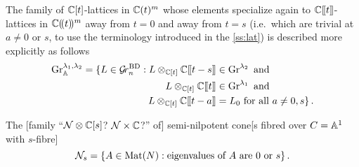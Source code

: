 \documentclass{article}
\begin{document}
The family  of $\CC[t]$-lattices in $\CC(t)^m$ whose elements specialize again to $\CC\xt$-lattices in $\CC\xT^m$ away from $t = 0$ and away from $t = s$ (i.e.\ which are trivial at $a \ne 0$ or $s$, to use the terminology introduced in the \cref{ss:lat}) is described more explicitly as follows
\begin{equation}
    \label{eq:defGrBDlambda}
    \begin{split}
        \Gr_{\AA}^{\lambda_1,\lambda_2} = 
        \{L \in\Grbd : 
        L \otimes_{\CC[t]} \CC\xt[t-s] 
        &\in \Gr^{\lambda_2} \text{ and } \\
        L\otimes_{\CC[t]} \CC\xt &\in \Gr^{\lambda_1} \text{ and } \\ 
        L \otimes_{\CC[t]} \CC\xt[t-a] &= L_0 \text{ for all $ a \ne 0, s$} \}\,.
    \end{split}
\end{equation}

% 

The [family ``$\cN\otimes\CC[s]$? $\cN\times\CC$?'' of] semi-nilpotent cone[s fibred over $C = \AA^1$ with $s$-fibre] 
\begin{equation}
    \cN_s = \{A \in \mat(N) : \text{eigenvalues of } A \text{ are } 0 \text{ or }s\}\,.
\end{equation}

\begin{comment}
    The [family of] slice[s $\TT_{\mu_1,\mu_2}$ fibred over $C=\AA^1$ with $s$-fibre]
\begin{equation}
    \begin{split}
        \TT_{\mu_1,\mu_2}^s = \{ B + C_s: B &\text{ is a }\mu\times\mu \text{ block matrix of zeros} \\
        &\text{except possibly in the last }\min(\mu_i,\mu_j) \\ 
        &\text{columns of the last row of each }\mu_i\times\mu_j \text{ block} \\
        &\text{and } C_s \text{ is the block diagonal matrix of}\\
        &\text{companion matrices of } t^{\mu_{1,k}}(t-s)^{\mu_{2,k}}\}\,.
    \end{split}
\end{equation}

The uppertriangular subfamily $\TT_{\mu_1,\mu_2}^{+}$ with $s$-fibre
\begin{equation}
    \TT_{\mu_1,\mu_2}^{+,s} = \{B + C_s \in \TT_{\mu_1,\mu_2} : B \in\n\}
\end{equation}
where $\n\subset\mat(N)$ is the unipotent subalgebra of uppertriangular matrices.
\end{comment}
\end{document}

